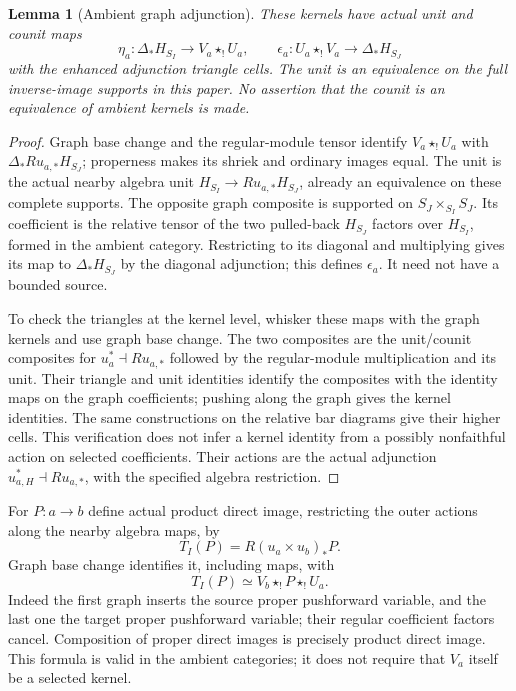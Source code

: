 \documentclass[11pt]{article}
\newtheorem{lemma}[proposition]{Lemma}
\theoremstyle{definition}
\theoremstyle{remark}
\begin{document}
\begin{lemma}[Ambient graph adjunction]\label{lem:graph-adjunction}
These kernels have actual unit and counit maps
\[
 \eta_a:\Delta_*H_{S_I}\longrightarrow V_a\star_!U_a,
 \qquad \epsilon_a:U_a\star_!V_a\longrightarrow\Delta_*H_{S_J}
\]
with the enhanced adjunction triangle cells.  The unit is an
equivalence on the full inverse-image supports in this paper.
No assertion that the counit is an equivalence of ambient kernels
is made.
\end{lemma}
\begin{proof}
Graph base change and the regular-module tensor identify
$V_a\star_!U_a$ with $\Delta_*Ru_{a,*}H_{S_J}$; properness makes
its shriek and ordinary images equal.  The unit is the actual nearby
algebra unit $H_{S_I}\to Ru_{a,*}H_{S_J}$, already an equivalence
on these complete supports.  The opposite graph composite is supported
on $S_J\times_{S_I}S_J$.  Its coefficient is the relative tensor of
the two pulled-back $H_{S_J}$ factors over $H_{S_I}$, formed in the
ambient category.  Restricting to its diagonal and multiplying gives
its map to $\Delta_*H_{S_J}$ by the diagonal adjunction; this defines
$\epsilon_a$.  It need not have a bounded source.

To check the triangles at the kernel level, whisker these maps with
the graph kernels and use graph base change.  The two composites are
the unit/counit composites for $u_a^*\dashv Ru_{a,*}$ followed by the
regular-module multiplication and its unit.  Their triangle and unit
identities identify the composites with the identity maps on the graph
coefficients; pushing along the graph gives the kernel identities.
The same constructions on the relative bar diagrams give their
higher cells.  This verification does not infer a kernel identity
from a possibly nonfaithful action on selected coefficients.
Their actions are the actual adjunction
$u_{a,H}^*\dashv Ru_{a,*}$, with the specified algebra restriction.
\end{proof}

For $P:a\to b$ define actual product direct image, restricting the
outer actions along the nearby algebra maps, by
\[
 T_I(P)=R(u_a\times u_b)_*P.
\]
Graph base change identifies it, including maps, with
\begin{equation}
 T_I(P)\simeq V_b\star_!P\star_!U_a.
 \label{eq:product-sandwich}
\end{equation}
Indeed the first graph inserts the source proper pushforward variable,
and the last one the target proper pushforward variable; their
regular coefficient factors cancel.  Composition of proper direct
images is precisely product direct image.  This formula is valid in
the ambient categories; it does not require that $V_a$ itself be a
selected kernel.
\end{document}

